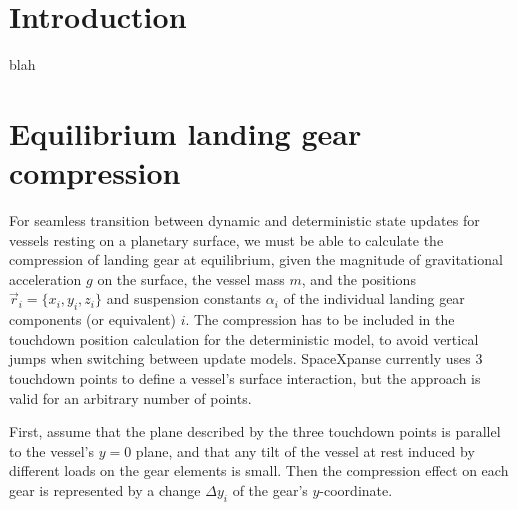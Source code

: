 \documentclass{article}
\begin{document}


\newcommand{\ACC}{\ensuremath\mathrm{A}}
\newcommand{\AACC}{\ensuremath\mathrm{T}}
\newcommand{\Euler}{\ensuremath\mathrm{E}}


\newcommand{\vR}[1]{\ensuremath{\vec{R}_{#1}}}
\newcommand{\nR}[1]{\ensuremath{|\vR{#1}|}}

\maketitle

\section{Introduction}
blah

\section{Equilibrium landing gear compression}\label{sec:equi_comp}
For seamless transition between dynamic and deterministic state updates for vessels resting on a planetary surface, we must be able to calculate the compression of landing gear at equilibrium, given the magnitude of gravitational acceleration $g$ on the surface, the vessel mass $m$, and the positions $\vec{r}_i = \lbrace x_i, y_i, z_i\rbrace$ and suspension constants $\alpha_i$ of the individual landing gear components (or equivalent) $i$. The compression has to be included in the touchdown position calculation for the deterministic model, to avoid vertical jumps when switching between update models. SpaceXpanse currently uses 3 touchdown points to define a vessel's surface interaction, but the approach is valid for an arbitrary number of points.

First, assume that the plane described by the three touchdown points is parallel to the vessel's $y=0$ plane, and that any tilt of the vessel at rest induced by different loads on the gear elements is small. Then the compression effect on each gear is represented by a change $\Delta y_i$ of the gear's $y$-coordinate.
\end{document}
